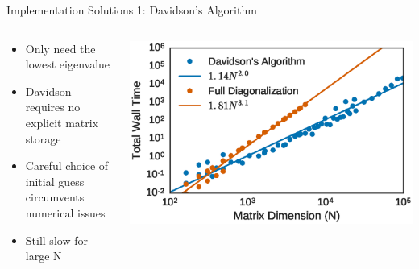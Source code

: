 \documentclass[10pt]{beamer}
\begin{document}
{{{{{{{{{{{%

\begin{frame}{Implementation Solutions 1: Davidson's Algorithm}
	\begin{columns}[c] %
		\begin{column}{.4\textwidth}
			\begin{itemize}
  			\item {Only need the lowest eigenvalue}
			  \item {Davidson requires no explicit matrix storage}
			  \item {Careful choice of initial guess circumvents numerical issues}
			  \item {Still slow for large N}
			\end{itemize}
		\end{column}
		\begin{column}{0.7\textwidth}
				\vspace{10mm}
		    \begin{overprint}
			    \includegraphics[width=\linewidth]{../figures/dav_vs_exact_scaling.eps}
			\end{overprint}
		\end{column}
	\end{columns}
\end{frame}

}}}}}}}}}}}
\end{document}
